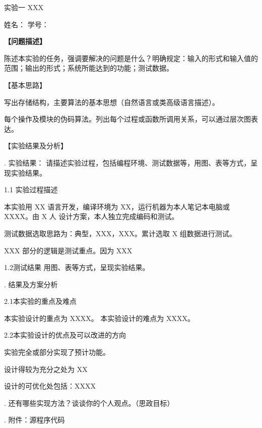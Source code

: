 \documentclass[a4paper]{article}
\newcommand{\exptitle}[1]{%
  \vspace*{7.8pt}
  \begin{center}
    {\fontsize{18pt}{21.6pt}\selectfont #1\par}
  \end{center}
  \vspace{7.8pt}
}
\newcommand{\studentinfo}{%
  \noindent 姓名：\underline{\makebox[2.65cm][c]{}}\quad
  学号：\underline{\makebox[2.65cm][c]{}}\par
  \vspace{7.8pt}
}
\newcommand{\reportsection}[1]{%
  \vspace{7.8pt}
  {\noindent\fontsize{14pt}{16.8pt}\selectfont #1\par}
  \vspace{7.8pt}
}
\newcommand{\reportsectionbold}[1]{%
  \vspace{7.8pt}
  {\noindent\fontsize{14pt}{16.8pt}\selectfont\bfseries #1\par}
  \vspace{7.8pt}
}
\newcommand{\normalpara}[1]{%
  \noindent #1\par
}
\newcommand{\indentpara}[1]{%
  \noindent\hspace*{2em}#1\par
}
\begin{document}
\fontsize{10.5pt}{15.6pt}\selectfont

\exptitle{实验一 XXX}

\studentinfo

\reportsectionbold{【问题描述】}
\indentpara{陈述本实验的任务，强调要解决的问题是什么？明确规定：输入的形式和输入值的范围；输出的形式；系统所能达到的功能；测试数据。}

\reportsection{【基本思路】}
\indentpara{写出存储结构，主要算法的基本思想（自然语言或类高级语言描述）。}
\indentpara{每个操作及模块的伪码算法。列出每个过程或函数所调用关系，可以通过层次图表达。}

\reportsection{【实验结果及分析】}
\normalpara{1. 实验结果： 请描述实验过程，包括编程环境、测试数据等，用图、表等方式，呈现实验结果。}

\indentpara{1.1 实验过程描述}

\begin{reportitems}
  \item 本实验用 XX 语言开发，编译环境为 XX，运行机器为本人笔记本电脑或 XXXX。由 X 人 设计方案，本人独立完成编码和测试。
  \item 测试数据选取思路为：典型，XXX，XXX。累计选取 X 组数据进行测试。
  \item XXX 部分的逻辑是测试重点。因为 XXX
\end{reportitems}

\noindent\hspace*{2em}1.2测试结果 用图、表等方式，呈现实验结果。\par

\normalpara{2. 结果及方案分析}

\indentpara{2.1本实验的重点及难点}
\indentpara{本实验设计的重点为 XXXX。 本实验设计的难点为 XXXX。}

\indentpara{2.2本实验设计的优点及可以改进的方向}
\indentpara{实验完全或部分实现了预计功能。}
\indentpara{设计得较为充分之处为 XX}
\indentpara{设计的可优化处包括：XXXX}

\normalpara{3. 还有哪些实现方法？谈谈你的个人观点。（思政目标）}
\indentpara{}

\normalpara{4. 附件：源程序代码}
\indentpara{}
\end{document}

